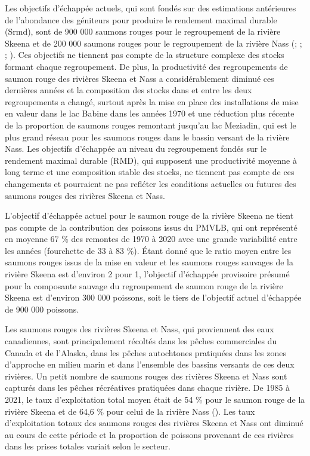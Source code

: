 \documentclass[french,11pt]{book}
\begin{document}
Les objectifs d'échappée actuels, qui sont fondés sur des estimations antérieures de l'abondance des géniteurs pour produire le rendement maximal durable (Srmd), sont de 900 000 saumons rouges pour le regroupement de la rivière Skeena et de 200 000 saumons rouges pour le regroupement de la rivière Nass (; ; ; ). Ces objectifs ne tiennent pas compte de la structure complexe des stocks formant chaque regroupement. De plus, la productivité des regroupements de saumon rouge des rivières Skeena et Nass a considérablement diminué ces dernières années et la composition des stocks dans et entre les deux regroupements a changé, surtout après la mise en place des installations de mise en valeur dans le lac Babine dans les années 1970 et une réduction plus récente de la proportion de saumons rouges remontant jusqu'au lac Meziadin, qui est le plus grand réseau pour les saumons rouges dans le bassin versant de la rivière Nass. Les objectifs d'échappée au niveau du regroupement fondés sur le rendement maximal durable (RMD), qui supposent une productivité moyenne à long terme et une composition stable des stocks, ne tiennent pas compte de ces changements et pourraient ne pas refléter les conditions actuelles ou futures des saumons rouges des rivières Skeena et Nass.

L'objectif d'échappée actuel pour le saumon rouge de la rivière Skeena ne tient pas compte de la contribution des poissons issus du PMVLB, qui ont représenté en moyenne 67 \% des remontes de 1970 à 2020 avec une grande variabilité entre les années (fourchette de 33 à 83 \%). Étant donné que le ratio moyen entre les saumons rouges issus de la mise en valeur et les saumons rouges sauvages de la rivière Skeena est d'environ 2 pour 1, l'objectif d'échappée provisoire présumé pour la composante sauvage du regroupement de saumon rouge de la rivière Skeena est d'environ 300 000 poissons, soit le tiers de l'objectif actuel d'échappée de 900 000 poissons.

Les saumons rouges des rivières Skeena et Nass, qui proviennent des eaux canadiennes, sont principalement récoltés dans les pêches commerciales du Canada et de l'Alaska, dans les pêches autochtones pratiquées dans les zones d'approche en milieu marin et dans l'ensemble des bassins versants de ces deux rivières. Un petit nombre de saumons rouges des rivières Skeena et Nass sont capturés dans les pêches récréatives pratiquées dans chaque rivière. De 1985 à 2021, le taux d'exploitation total moyen était de 54 \% pour le saumon rouge de la rivière Skeena et de 64,6 \% pour celui de la rivière Nass (). Les taux d'exploitation totaux des saumons rouges des rivières Skeena et Nass ont diminué au cours de cette période et la proportion de poissons provenant de ces rivières dans les prises totales variait selon le secteur.
\end{document}
